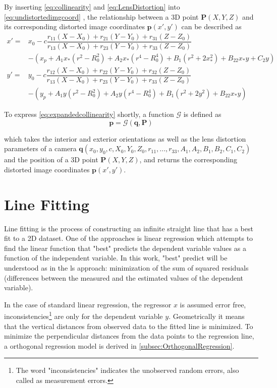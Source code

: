 By inserting \eqref{eq:collinearity} and \eqref{eq:LensDistortion} into \eqref{eq:undistortedimgcoord} , the relationship between a 3D point $\mathbf{P}(X, Y, Z)$ and its corresponding distorted image coordinates $\mathbf{p}(x\prime,y\prime)$ can be described as
\begin{equation} \label{eq:expandedcollinearity}
\begin{split}
x\prime =& x_0-c\dfrac{r_{11}(X-X_0)+r_{21}(Y-Y_0)+r_{31}(Z-Z_0)}{r_{13}(X-X_0)+r_{23}(Y-Y_0)+r_{33}(Z-Z_0)} \\
&-(x_p + A_1x_*(r^2-R_0^2) + A_2x_*(r^4-R_0^4) + B_1(r^2+2x_*^2) + B_22x_*y+C_2y)\\
y\prime =& y_0-c\dfrac{r_{12}(X-X_0)+r_{22}(Y-Y_0)+r_{32}(Z-Z_0)}{r_{13}(X-X_0)+r_{23}(Y-Y_0)+r_{33}(Z-Z_0)} \\
&-(y_p + A_1y  (r^2-R_0^2) + A_2y  (r^4-R_0^4) + B_1(r^2+2y^2)   + B_22x_*y)
\end{split}
\end{equation}

To express \eqref{eq:expandedcollinearity} shortly, a function $\mathcal{G}$ is defined as
\begin{equation} \label{eq:Gfunction}
\mathbf{p} = \mathcal{G}(\mathbf{q},\mathbf{P}) 
\end{equation}

which takes the interior and exterior orientations as well as the lens distortion parameters of a camera $\mathbf{q}(x_0,y_0,c,X_0,Y_0,Z_0,r_{11},...,r_{33},A_1,A_2,B_1,B_2,C_1,C_2)$ and the position of a 3D point $\mathbf{P}(X, Y, Z)$, and returns the corresponding distorted image coordinates $\mathbf{p}(x\prime,y\prime)$.

\clearpage
\section{Line Fitting}
\label{sec:LineFitting}

Line fitting is the process of constructing an infinite straight line that has a best fit to a 2D dataset. One of the approaches is linear regression which attempts to find the linear function that "best" predicts the dependent variable values as a function of the independent variable. In this work, "best" predict will be understood as in the \gls{ls} approach: minimization of the sum of squared residuals (differences between the measured and the estimated values of the dependent variable).

In the case of standard linear regression, the regressor $x$ is assumed error free, inconsistencies\footnote{The word "inconsistencies" indicates the unobserved random errors, also called as measurement errors.} are only for the dependent variable $y$. Geometrically it means that the vertical distances from observed data to the fitted line is minimized. To minimize the perpendicular distances from the data points to the regression line, a orthogonal regression model is derived in \cref{subsec:OrthogonalRegression}.

